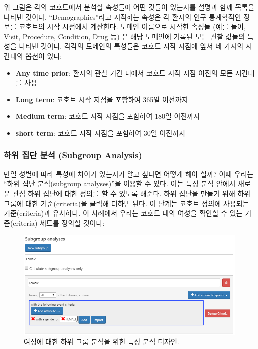 \documentclass[11pt]{book}
\theoremstyle{definition}
\theoremstyle{definition}
\theoremstyle{definition}
\theoremstyle{remark}
\begin{document}
위 그림은 각의 코호트에서 분석할 속성들에 어떤 것들이 있는지를 설명과
함께 목록을 나타낸 것이다. ``Demographics''라고 시작하는 속성은 각
환자의 인구 통계학적인 정보를 코호트의 시작 시점에서 계산한다. 도메인
이름으로 시작한 속성들 (예를 들어, Visit, Procedure, Condition, Drug 등)
은 해당 도메인에 기록된 모든 관찰 값들의 특성을 나타낸 것이다. 각각의
도메인의 특성들은 코호트 시작 지점에 앞서 네 가지의 시간대의 옵션이
있다:

\begin{itemize}
\item
  \textbf{Any time prior}: 환자의 관찰 기간 내에서 코호트 시작 지점
  이전의 모든 시간대를 사용
\item
  \textbf{Long term}: 코호트 시작 지점을 포함하여 365일 이전까지
\item
  \textbf{Medium term}: 코호트 시작 지점을 포함하여 180일 이전까지
\item
  \textbf{short term}: 코호트 시작 지점을 포함하여 30일 이전까지
\end{itemize}

\subsubsection*{하위 집단 분석 (Subgroup
Analysis)}\label{---subgroup-analysis}

만일 성별에 따라 특성에 차이가 있는지가 알고 싶다면 어떻게 해야 할까?
이때 우리는 ``하위 집단 분석(subgroup analyses)''을 이용할 수 있다. 이는
특성 분석 안에서 새로운 관심 하위 집단에 대한 정의를 할 수 있도록
해준다. 하위 집단을 만들기 위해 하위 그룹에 대한 기준(criteria)을 클릭해
더하면 된다. 이 단계는 코호트 정의에 사용되는 기준(criteria)과 유사하다.
이 사례에서 우리는 코호트 내의 여성을 확인할 수 있는 기준(criteria)
세트를 정의할 것이다:

\begin{figure}

{\centering \includegraphics[width=1\linewidth]{images/Characterization/atlasCharacterizationSubgroup} 

}

\caption{여성에 대한 하위 그룹 분석을 위한 특성 분석 디자인.}\label{fig:atlasCharacterizationSubgroup}
\end{figure}
\end{document}
